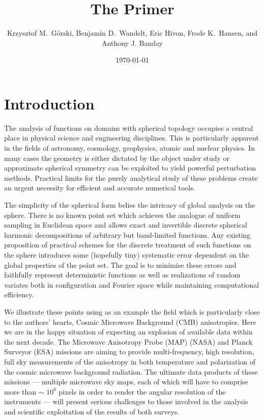\documentclass[12pt,twoside]{article}
\begin{document}
\title{The \healpix Primer}
\author{Krzysztof M.~G\'orski, Benjamin D.~Wandelt, Eric Hivon, Frode K.~Hansen,
and Anthony J. Banday}
%
\date{\today}

\frontpage
\tableofcontents
\newpage

\section{Introduction}

The analysis of functions on  domains with spherical topology occupies a
central place in physical science and engineering disciplines. 
This is particularly apparent in the fields of astronomy, cosmology, 
geophysics,  atomic and nuclear physics. In many cases the geometry is either
dictated by the object under study or approximate spherical symmetry can be
exploited to yield powerful perturbation methods. Practical
limits for the purely analytical study of these problems create
an urgent necessity for efficient and accurate numerical tools.

The 
simplicity of the spherical form belies the intricacy of global
analysis on the sphere. There is no known
point set which achieves the analogue of uniform sampling in Euclidean space and
allows exact and invertible discrete spherical harmonic decompositions
of arbitrary but band-limited functions. Any existing proposition of practical
schemes for the  discrete treatment of such functions 
on the sphere  introduces some (hopefully tiny) 
systematic error dependent on the global properties of
the point set. The goal is to minimise these errors and
faithfully represent deterministic functions as well as realizations of
random variates both
in configuration and Fourier space while maintaining computational efficiency.

We illustrate these points using as an example the field which is particularly 
close to the authors' hearts, Cosmic Microwave Background (CMB)
anisotropies. Here we are in the happy situation of expecting an explosion
of available data within the next decade.
The  Microwave Anisotropy Probe (MAP) (NASA) and Planck Surveyor (ESA)
missions are aiming
to provide multi-frequency, high resolution, full sky measurements of the anisotropy in
both temperature and polarization of the cosmic microwave
background radiation.
The ultimate data products of these missions ---
multiple microwave sky maps, each of which will have to comprise 
more than $\sim $ $10^6$ pixels in order to render the angular 
resolution of the instruments ---
will present serious challenges to those involved in the
analysis and scientific exploitation of the results of both surveys.
 
\end{document}
